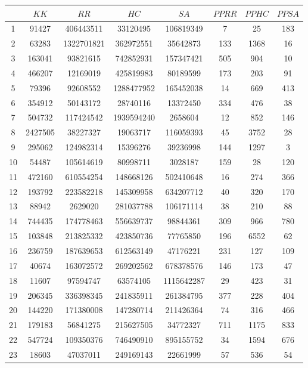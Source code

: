 \documentclass[solution, letterpaper]{cs121}
\begin{document}
\begin{center}
\begin{tabular}{ c |c c c c c c c}
   & $KK$ & $RR$ & $HC$ & $SA$ & $PPRR$ & $PPHC$ & $PPSA$  \\
   \hline
1 & 91427 & 406443511 & 33120495 & 106819349 & 7 & 25 & 183 \\
2 & 63283 & 1322701821 & 362972551 & 35642873 & 133 & 1368 & 16 \\
3 & 163041 & 93821615 & 742852931 & 157347421 & 505 & 904 & 10 \\
4 & 466207 & 12169019 & 425819983 & 80189599 & 173 & 203 & 91 \\
5 & 79396 & 92608552 & 1288477952 & 165452038 & 14 & 669 & 413 \\
6 & 354912 & 50143172 & 28740116 & 13372450 & 334 & 476 & 38 \\
7 & 504732 & 117424542 & 1939594240 & 2658604 & 12 & 852 & 146 \\
8 & 2427505 & 38227327 & 19063717 & 116059393 & 45 & 3752 & 28 \\
9 & 295062 & 124982314 & 15396276 & 39236998 & 144 & 1297 & 3 \\
10 & 54487 & 105614619 & 80998711 & 3028187 & 159 & 28 & 120 \\
11 & 472160 & 610554254 & 148668126 & 502410648 & 16 & 274 & 366 \\
12 & 193792 & 223582218 & 145309958 & 634207712 & 40 & 320 & 170 \\
13 & 88942 & 2629020 & 281037788 & 106171114 & 38 & 210 & 88 \\
14 & 744435 & 174778463 & 556639737 & 98844361 & 309 & 966 & 780 \\
15 & 103848 & 213825332 & 423850736 & 77765850 & 196 & 6552 & 62 \\
16 & 236759 & 187639653 & 612563149 & 47176221 & 231 & 127 & 109 \\
17 & 40674 & 163072572 & 269202562 & 678378576 & 146 & 173 & 47 \\
18 & 11607 & 97594747 & 63574105 & 1115642287 & 29 & 423 & 31 \\
19 & 206345 & 336398345 & 241835911 & 261384795 & 377 & 228 & 404 \\
20 & 144220 & 171380008 & 147280714 & 211426364 & 74 & 316 & 466 \\
21 & 179183 & 56841275 & 215627505 & 34772327 & 711 & 1175 & 833 \\
22 & 547724 & 109350376 & 746490910 & 895155752 & 34 & 1594 & 676 \\
23 & 18603 & 47037011 & 249169143 & 22661999 & 57 & 536 & 54 \\

\end{tabular}
\end{center}
\end{document}
